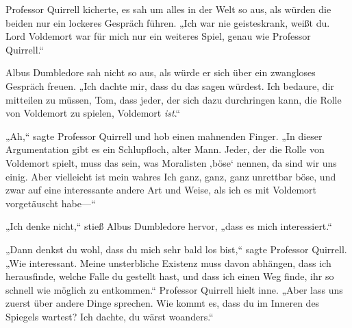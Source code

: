 Professor Quirrell kicherte, es sah um alles in der Welt so aus, als würden die beiden nur ein lockeres Gespräch führen.
„Ich war nie geisteskrank, weißt du. Lord Voldemort war für mich nur ein weiteres Spiel, genau wie Professor Quirrell.“

Albus Dumbledore sah nicht so aus, als würde er sich über ein zwangloses Gespräch freuen. „Ich dachte mir, dass du das sagen würdest. Ich bedaure, dir mitteilen zu müssen, Tom, dass jeder, der sich dazu durchringen kann, die Rolle von Voldemort zu spielen, Voldemort \emph{ist}.“

„Ah,“ sagte Professor Quirrell und hob einen mahnenden Finger. „In dieser Argumentation gibt es ein Schlupfloch, alter Mann. Jeder, der die Rolle von Voldemort spielt, muss das sein, was Moralisten ‚böse‘ nennen, da sind wir uns einig. Aber vielleicht ist mein wahres Ich ganz, ganz, ganz unrettbar böse, und zwar auf eine interessante andere Art und Weise, als ich es mit Voldemort vorgetäuscht habe—“

„Ich denke nicht,“ stieß Albus Dumbledore hervor, „dass es mich interessiert.“

„Dann denkst du wohl, dass du mich sehr bald los bist,“ sagte Professor Quirrell. „Wie interessant. Meine unsterbliche Existenz muss davon abhängen, dass ich herausfinde, welche Falle du gestellt hast, und dass ich einen Weg finde, ihr so schnell wie möglich zu entkommen.“ Professor Quirrell hielt inne. „Aber lass uns zuerst über andere Dinge sprechen. Wie kommt es, dass du im Inneren des Spiegels wartest? Ich dachte, du wärst woanders.“


